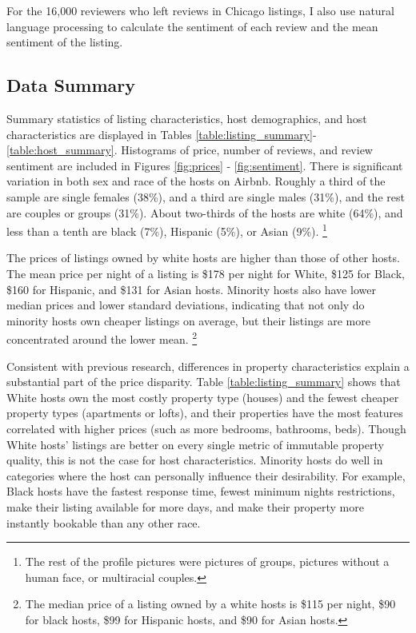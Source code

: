 For the 16,000 reviewers who left reviews in Chicago listings, I also use natural language processing to calculate the sentiment of each review and the mean sentiment of the listing. 




\newpage	
\singlespacing
%







\subsection{Data Summary}
\label{summary}

Summary statistics of listing characteristics, host demographics, and host characteristics are displayed in Tables \ref{table:listing_summary}-\ref{table:host_summary}. Histograms of price, number of reviews, and review sentiment are included in Figures \ref{fig:prices} - \ref{fig:sentiment}. There is significant variation in both sex and race of the hosts on Airbnb. Roughly a third of the sample are single females (38\%), and a third are single males (31\%), and the rest are couples or groups (31\%). About two-thirds of the hosts are white (64\%), and less than a tenth are black (7\%), Hispanic (5\%), or Asian (9\%).%
	\footnote{The rest of the profile pictures were pictures of groups, pictures without a human face, or multiracial couples.} 

The prices of listings owned by white hosts are higher than those of other hosts. The mean price per night of a listing is \$178 per night for White, \$125 for Black, \$160 for Hispanic, and \$131 for Asian hosts. Minority hosts also have lower median prices and lower standard deviations, indicating that not only do minority hosts own cheaper listings on average, but their listings are more concentrated around the lower mean.%
	\footnote{The median price of a listing owned by a white hosts is \$115 per night, \$90 for black hosts, \$99 for Hispanic hosts, and \$90 for Asian hosts.} 

Consistent with previous research, differences in property characteristics explain a substantial part of the price disparity. Table \ref{table:listing_summary} shows that White hosts own the most costly property type (houses) and the fewest cheaper property types (apartments or lofts), and their properties have the most features correlated with higher prices (such as more bedrooms, bathrooms, beds). Though White hosts' listings are better on every single metric of immutable property quality, this is not the case for host characteristics. Minority hosts do well in categories where the host can personally influence their desirability. For example, Black hosts have the fastest response time, fewest minimum nights restrictions, make their listing available for more days, and make their property more instantly bookable than any other race.  

